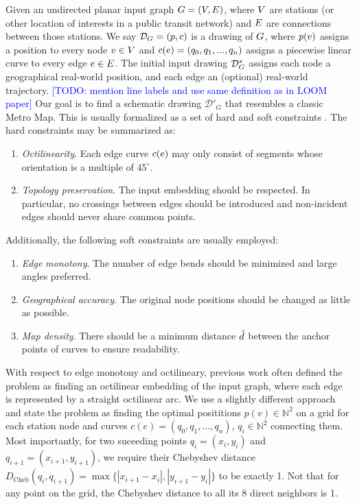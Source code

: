 \documentclass{sig-alternate-sigmod09}
\newcommand\TODO[1]{\textcolor{blue}{\small [TODO: #1]}}
\begin{document}
Given an undirected planar input graph $G = (V, E)$, where $V$ are stations (or other location of interests in a public transit network) and $E$ are connections between those stations.
We say $\mathcal{D}_{G} = (p, c)$ is a drawing of $G$, where $p(v)$ assigns a position to every node $v \in V$ and $c(e) = (q_0, q_1, ..., q_n)$ assigns a piecewise linear curve to every edge $e \in E$.
The initial input drawing $\mathcal{D}_{G}^*$ assigns each node a geographical real-world position, and each edge an (optional) real-world trajectory.
\TODO{mention line labels and use same definition as in LOOM paper}
Our goal is to find a schematic drawing $\mathcal{D}'_G$ that resembles a classic Metro Map.
This is usually formalized as a set of hard and soft constraints \cite{nb, ...}.
The hard constraints may be summarized as:
\begin{enumerate}
\setlength\itemsep{.1em}
\item \emph{Octilinearity}. Each edge curve $c(e)$ may only consist of segments whose orientation is a multiple of $45^{\circ}$.
\item \emph{Topology preservation}. The input embedding should be respected. In particular, no crossings between edges should be introduced and non-incident edges should never share common points.
\end{enumerate}
Additionally, the following soft constraints are usually employed:
\begin{enumerate}
\setlength\itemsep{.1em}
\item \emph{Edge monotony}. The number of edge bends should be minimized and large angles preferred.
\item \emph{Geographical accuracy}. The original node positions should be changed as little as possible.
\item \emph{Map density}. There should be a minimum distance $\hat d$ between the anchor points of curves to ensure readability.
\end{enumerate}

With respect to edge monotony and octilineary, previous work often defined the problem as finding an octilinear embedding of the input graph, where each edge is represented by a straight octilinear arc.
We use a slightly different approach and state the problem as finding the optimal posititions $p(v) \in \mathbb{N}^2$ on a grid for each station node and curves $c(e) = (q_0, q_1, ..., q_n)$, $q_i \in \mathbb{N}^2$ connecting them. 
Most importantly, for two suceeding points $q_i = (x_i, y_i)$ and $q_{i+1} = (x_{i+1}, y_{i+1})$, we require their Chebyshev distance $D_\text{Cheb}(q_i, q_{i+1}) = \max \{|x_{i+1} - x_i|, |y_{i+1} - y_i|\}$ to be exactly 1.
Not that for any point on the grid, the Chebyshev distance to all its 8 direct neighbors is 1.
\end{document}
